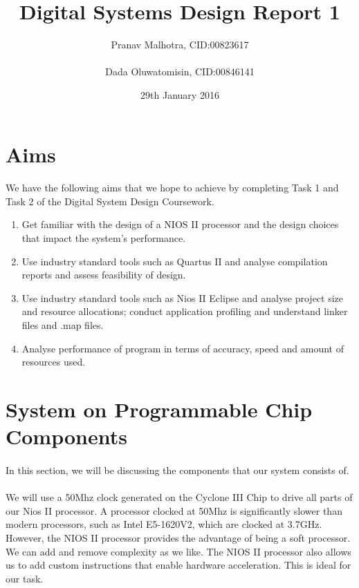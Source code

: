 \documentclass{article}
\title{Digital Systems Design Report 1}
\author{
  Pranav Malhotra, CID:\num{00823617}\\\\
  Dada Oluwatomisin, CID:\num{00846141}\\
}
\date{29th January 2016}
\begin{document}
\maketitle

\newpage
\tableofcontents

\newpage
\section{Aims}
\paragraph{}
We have the following aims that we hope to achieve by completing Task \num{1} and Task \num{2} of the Digital System Design Coursework.
\begin{enumerate}
  \item Get familiar with the design of a NIOS II processor and the design choices that impact the system’s performance.
  \item Use industry standard tools such as Quartus II and analyse compilation reports and assess feasibility of design.
  \item Use industry standard tools such as Nios II Eclipse and analyse project size and resource allocations; conduct application profiling and understand linker files and .map files. 
  \item Analyse performance of program in terms of accuracy, speed and amount of resources used.
\end{enumerate}

\newpage
\section{System on Programmable Chip Components}
\paragraph{}
In this section, we will be discussing the components that our system consists of.
\paragraph{}
We will use a \num{50}Mhz clock generated on the Cyclone III Chip to drive all parts of our Nios II processor. A processor clocked at \num{50}Mhz is significantly slower than modern processors, such as Intel E\num{5}-\num{1620}V\num{2}, which are clocked at \num{3.7}GHz\cite{intel}. However, the NIOS II processor provides the advantage of being a soft processor. We can add and remove complexity as we like. The NIOS II processor also allows us to add custom instructions that enable hardware acceleration. This is ideal for our task.
\end{document}
